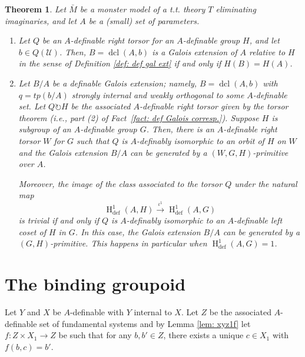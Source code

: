 \documentclass{amsart}
\newtheorem{theorem}{Theorem}[section]
\theoremstyle{definition}
\theoremstyle{remark}
\numberwithin{equation}{section}
\def \U {\mathcal U}
\def \defin {\operatorname{def}}
\def \HH {\operatorname{H}}
\def \dcl {\operatorname{dcl}}
\begin{document}
\begin{theorem}\label{thm: cohomological fact}\cite{OmarDavid2026} Let $\bar{M}$ be a monster model of a t.t. theory $T$ eliminating imaginaries, and let $A$ be a (small) set of parameters.
\begin{enumerate}
    \item Let $Q$ be an $A$-definable right torsor for an $A$-definable group $H$, and let $b \in Q(\U)$. Then, $B=\dcl(A,b)$ is a Galois extension of $A$ relative to $H$ in the sense of Definition \ref{def: def gal ext} if and only if $H(B)= H(A)$.
    
    \item Let $B/A$ be a definable Galois extension; namely, $B=\dcl(A,b)$ with $q=tp(b/A)$ strongly internal and weakly orthogonal to some $A$-definable set. Let $Q \circlearrowright H$ be the associated $A$-definable right torsor given by the torsor theorem (i.e., part (2) of Fact~\ref{fact: def Galois corresp.}). Suppose $H$ is subgroup of an $A$-definable group $G$. Then, there is an $A$-definable right torsor $W$ for $G$ such that $Q$ is $A$-definably isomorphic to an orbit of $H$ on $W$ and the Galois extension $B/A$ can be generated by a $(W,G,H)$-primitive over $A$.
        
        Moreover, the image of the class associated to the torsor $Q$ under the natural map 
        $$\HH^1_{\defin}(A,H) \xrightarrow{\iota^1} \HH^1_{\defin}(A,G)$$ is trivial if and only if $Q$ is $A$-definably isomorphic to an $A$-definable left coset of $H$ in $G$. In this case, the Galois extension $B/A$ can be generated by a $(G,H)$-primitive. This happens in particular when $\HH^1_{\defin}(A,G) = 1$.
\end{enumerate}
\end{theorem}

\section{The binding groupoid}\label{sec: binding}

Let $Y$ and $X$ be $A$-definable with $Y$ internal to $X$. Let $Z$ be the associated $A$-definable set of fundamental systems and by Lemma \ref{lem: xyz1f} let $f:Z\times X_1 \to Z$ be such that for any $b,b'\in Z$, there exists a unique $c\in X_1$ with $f(b,c) = b'$.
\end{document}
